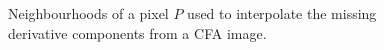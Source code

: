 \documentclass[twoside]{article}
\begin{document}
\begin{figure}
	\centering
	\quad
	\quad
	\caption{Neighbourhoods of a pixel $P$ used to interpolate the missing derivative components from a CFA image.}
	\label{fig:neighbourhoods}
\end{figure}
\end{document}
